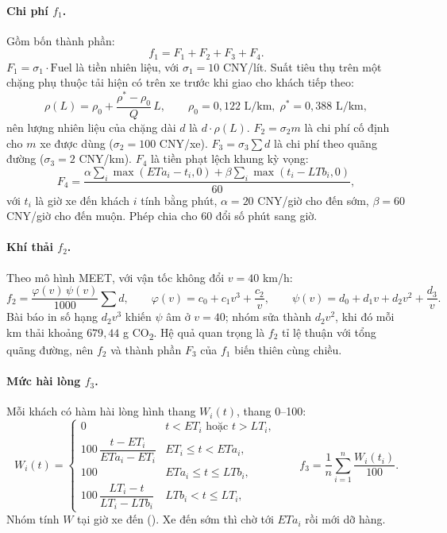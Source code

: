 \paragraph{Chi phí $f_1$.} Gồm bốn thành phần:
\begin{equation}
  f_1 = F_1 + F_2 + F_3 + F_4 .
\end{equation}
$F_1 = \sigma_1 \cdot \text{Fuel}$ là tiền nhiên liệu, với $\sigma_1 = 10$ CNY/lít. Suất tiêu thụ trên
một chặng phụ thuộc tải hiện có trên xe trước khi giao cho khách tiếp theo:
\begin{equation}
  \rho(L) = \rho_0 + \frac{\rho^* - \rho_0}{Q}\, L ,
  \qquad \rho_0 = 0{,}122 \text{ L/km},\; \rho^* = 0{,}388 \text{ L/km},
\end{equation}
nên lượng nhiên liệu của chặng dài $d$ là $d\cdot\rho(L)$. $F_2 = \sigma_2 m$ là chi phí cố định cho
$m$ xe được dùng ($\sigma_2 = 100$ CNY/xe). $F_3 = \sigma_3 \sum d$ là chi phí theo quãng đường
($\sigma_3 = 2$ CNY/km). $F_4$ là tiền phạt lệch khung kỳ vọng:
\begin{equation}
  F_4 = \frac{\alpha \sum_i \max(ETa_i - t_i, 0) + \beta \sum_i \max(t_i - LTb_i, 0)}{60},
\end{equation}
với $t_i$ là giờ xe đến khách $i$ tính bằng phút, $\alpha = 20$ CNY/giờ cho đến sớm, $\beta = 60$
CNY/giờ cho đến muộn. Phép chia cho 60 đổi số phút sang giờ.

\paragraph{Khí thải $f_2$.} Theo mô hình MEET, với vận tốc không đổi $v = 40$ km/h:
\begin{equation}
  f_2 = \frac{\varphi(v)\,\psi(v)}{1000} \sum d, \qquad
  \varphi(v) = c_0 + c_1 v^3 + \frac{c_2}{v}, \qquad
  \psi(v) = d_0 + d_1 v + d_2 v^2 + \frac{d_3}{v}.
\end{equation}
Bài báo in số hạng $d_2 v^3$ khiến $\psi$ âm ở $v = 40$; nhóm sửa thành $d_2 v^2$, khi đó mỗi km thải
khoảng $679{,}44$ g CO\textsubscript{2}. Hệ quả quan trọng là $f_2$ tỉ lệ thuận với tổng quãng đường,
nên $f_2$ và thành phần $F_3$ của $f_1$ biến thiên cùng chiều.

\paragraph{Mức hài lòng $f_3$.} Mỗi khách có hàm hài lòng hình thang $W_i(t)$, thang 0--100:
\begin{equation}
  W_i(t) =
  \begin{cases}
    0 & t < ET_i \text{ hoặc } t > LT_i,\\[2pt]
    100\,\dfrac{t - ET_i}{ETa_i - ET_i} & ET_i \le t < ETa_i,\\[6pt]
    100 & ETa_i \le t \le LTb_i,\\[2pt]
    100\,\dfrac{LT_i - t}{LT_i - LTb_i} & LTb_i < t \le LT_i,
  \end{cases}
  \qquad
  f_3 = \frac{1}{n}\sum_{i=1}^{n} \frac{W_i(t_i)}{100}.
\end{equation}
Nhóm tính $W$ tại giờ xe đến (). Xe đến sớm thì chờ tới $ETa_i$ rồi
mới dỡ hàng.

